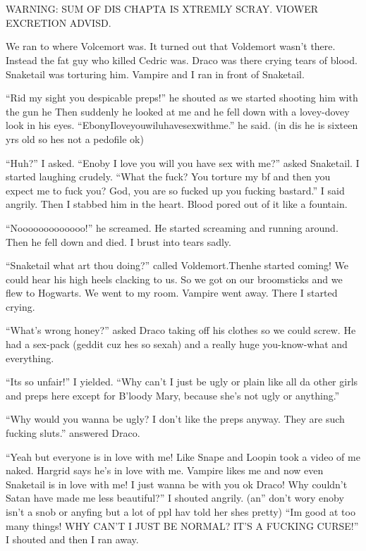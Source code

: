 \section{}



WARNING: SUM OF DIS CHAP\-TA IS XTREM\-LY
\linebreak SCRAY\@. VIOWER EX\-CRE\-TION ADVISD.

We ran to where Volcemort was. It turned out that Voldemort wasn't there. Instead the fat guy who killed Cedric was. Draco was there crying tears of blood. Snaketail was torturing him. Vampire and I ran in front of Snaketail.

\enquote{Rid my sight you despicable preps!} he shouted as we started shooting him with the gun he Then suddenly he looked at me and he fell down with a lovey-dovey look in his eyes. \enquote{EbonyIloveyouwiluhavesexwithme.} he said. (in dis he is sixteen yrs old so hes not a pedofile ok)

\enquote{Huh?} I asked.
\enquote{Enoby I love you will you have sex with me?} asked Snaketail. I started laughing crudely. \enquote{What the fuck? You torture my bf and then you expect me to fuck you? God, you are so fucked up you fucking bastard.} I said angrily. Then I stabbed him in the heart. Blood pored out of it like a fountain.

\enquote{Nooooooooooooo!} he screamed. He started screaming and running around. Then he fell down and died. I brust into tears sadly.

\enquote{Snaketail what art thou doing?} called Voldemort.\linebreak Then\dotfill he started coming! We could hear his high heels clacking to us. So we got on our broomsticks and we flew to Hogwarts. We went to my room. Vampire went away. There I started crying.

\enquote{What's wrong honey?} asked Draco taking off his clothes so we could screw. He had a sex-pack (geddit cuz hes so sexah) and a really huge you-know-what and everything.

\enquote{Its so unfair!} I yielded. \enquote{Why can't I just be ugly or plain like all da other girls and preps here except for B'loody Mary, because she's not ugly or anything.}

\enquote{Why would you wanna be ugly? I don't like the preps anyway. They are such fucking sluts.} answered Draco.

\enquote{Yeah but everyone is in love with me! Like Snape and Loopin took a video of me naked. Hargrid says he's in love with me. Vampire likes me and now even Snaketail is in love with me! I just wanna be with you ok Draco! Why couldn't Satan have made me less beautiful?} I shouted angrily. (an'' don't wory enoby isn't a snob or anyfing but a lot of ppl hav told her shes pretty) \enquote{Im good at too many things! WHY CAN'T I JUST BE NORMAL\@? IT'S A FUCKING CURSE\@!} I shouted and then I ran away.
